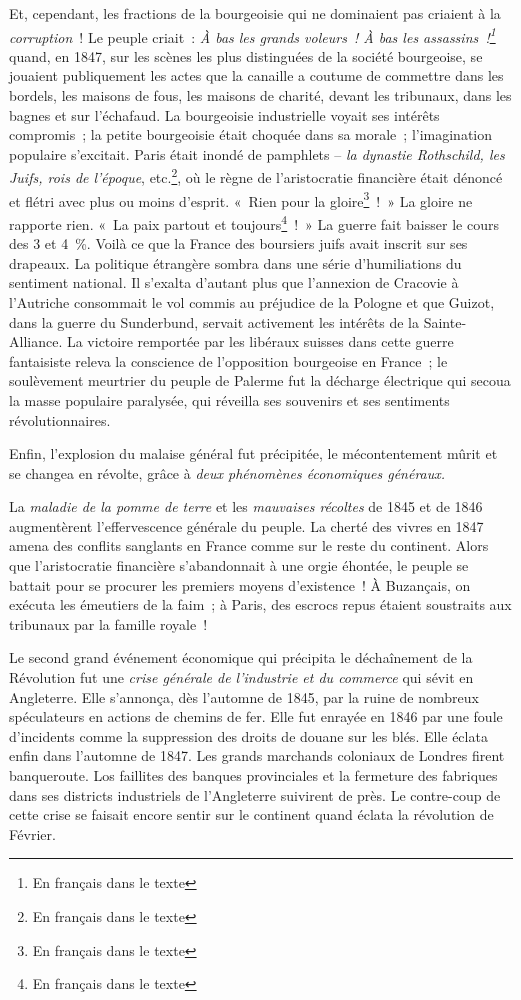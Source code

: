 \documentclass[french,twoside]{book} %
\begin{document}
Et, cependant, les fractions de la bourgeoisie qui ne dominaient pas criaient à la \emph{corruption} ! Le peuple criait : \emph{À bas les grands voleurs ! À bas les assassins !\footnote{En français dans le texte}} quand, en 1847, sur les scènes les plus distinguées de la société bourgeoise, se jouaient publiquement les actes que la canaille a coutume de commettre dans les bordels, les maisons de fous, les maisons de charité, devant les tribunaux, dans les bagnes et sur l’échafaud. La bourgeoisie industrielle voyait ses intérêts compromis ; la petite bourgeoisie était choquée dans sa morale ; l’imagination populaire s’excitait. Paris était inondé de pamphlets – \emph{la dynastie Rothschild, les Juifs, rois de l’époque}, etc.\footnote{En français dans le texte}, où le règne de l’aristocratie financière était dénoncé et flétri avec plus ou moins d’esprit. « Rien pour la gloire\footnote{En français dans le texte} ! » La gloire ne rapporte rien. « La paix partout et toujours\footnote{En français dans le texte} ! » La guerre fait baisser le cours des 3 et 4 \%. Voilà ce que la France des boursiers juifs avait inscrit sur ses drapeaux. La politique étrangère sombra dans une série d’humiliations du sentiment national. Il s’exalta d’autant plus que l’annexion de Cracovie à l’Autriche consommait le vol commis au préjudice de la Pologne et que Guizot, dans la guerre du Sunderbund, servait activement les intérêts de la Sainte-Alliance. La victoire remportée par les libéraux suisses dans cette guerre fantaisiste releva la conscience de l’opposition bourgeoise en France ; le soulèvement meurtrier du peuple de Palerme fut la décharge électrique qui secoua la masse populaire paralysée, qui réveilla ses souvenirs et ses sentiments révolutionnaires.\par
Enfin, l’explosion du malaise général fut précipitée, le mécontentement mûrit et se changea en révolte, grâce à \emph{deux phénomènes économiques généraux.}\par
La \emph{maladie de la pomme de terre} et les \emph{mauvaises récoltes} de 1845 et de 1846 augmentèrent l’effervescence générale du peuple. La cherté des vivres en 1847 amena des conflits sanglants en France comme sur le reste du continent. Alors que l’aristocratie financière s’abandonnait à une orgie éhontée, le peuple se battait pour se procurer les premiers moyens d’existence ! À Buzançais, on exécuta les émeutiers de la faim ; à Paris, des escrocs repus étaient soustraits aux tribunaux par la famille royale !\par
Le second grand événement économique qui précipita le déchaînement de la Révolution fut une \emph{crise générale de l’industrie et du commerce} qui sévit en Angleterre. Elle s’annonça, dès l’automne de 1845, par la ruine de nombreux spéculateurs en actions de chemins de fer. Elle fut enrayée en 1846 par une foule d’incidents comme la suppression des droits de douane sur les blés. Elle éclata enfin dans l’automne de 1847. Les grands marchands coloniaux de Londres firent banqueroute. Los faillites des banques provinciales et la fermeture des fabriques dans ses districts industriels de l’Angleterre suivirent de près. Le contre-coup de cette crise se faisait encore sentir sur le continent quand éclata la révolution de Février.\par
\end{document}
